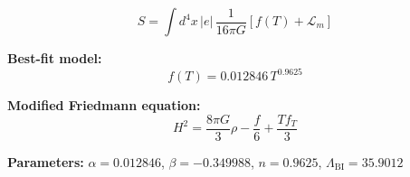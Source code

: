 
\begin{equation}
  S = \int d^4x \, |e| \, \frac{1}{16\pi G} \left[ f(T) + \mathcal{L}_m \right]
\end{equation}

\textbf{Best-fit model:}
\begin{equation}
  f(T) = 0.012846 \, T^{0.9625}
\end{equation}

\textbf{Modified Friedmann equation:}
\begin{equation}
  H^2 = \frac{8\pi G}{3} \rho - \frac{f}{6} + \frac{T f_T}{3}
\end{equation}

\textbf{Parameters:}
$\alpha = 0.012846$, \quad
$\beta = -0.349988$, \quad
$n = 0.9625$, \quad
$\Lambda_{\text{BI}} = 35.9012$